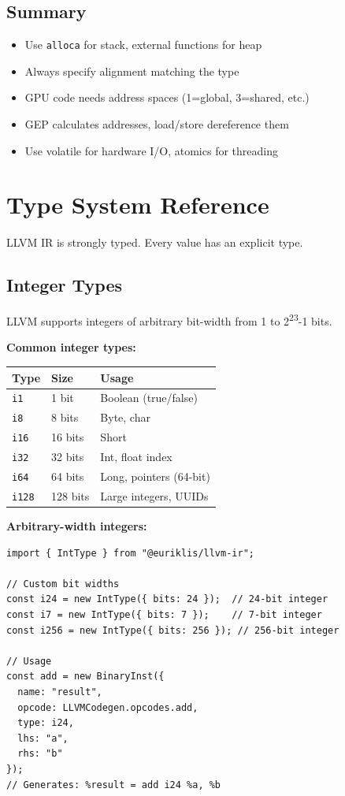 \documentclass[11pt]{article}
\begin{document}
\subsection{Summary}

\begin{itemize}[noitemsep]
  \item Use \texttt{alloca} for stack, external functions for heap
  \item Always specify alignment matching the type
  \item GPU code needs address spaces (1=global, 3=shared, etc.)
  \item GEP calculates addresses, load/store dereference them
  \item Use volatile for hardware I/O, atomics for threading
\end{itemize}

\section{Type System Reference}

LLVM IR is strongly typed. Every value has an explicit type.

\subsection{Integer Types}

LLVM supports integers of arbitrary bit-width from 1 to 2\textsuperscript{23}-1 bits.

\textbf{Common integer types:}
\begin{center}
\begin{tabular}{|l|l|l|}
\hline
\textbf{Type} & \textbf{Size} & \textbf{Usage} \\
\hline
\texttt{i1} & 1 bit & Boolean (true/false) \\
\texttt{i8} & 8 bits & Byte, char \\
\texttt{i16} & 16 bits & Short \\
\texttt{i32} & 32 bits & Int, float index \\
\texttt{i64} & 64 bits & Long, pointers (64-bit) \\
\texttt{i128} & 128 bits & Large integers, UUIDs \\
\hline
\end{tabular}
\end{center}

\textbf{Arbitrary-width integers:}
\begin{lstlisting}[style=ts]
import { IntType } from "@euriklis/llvm-ir";

// Custom bit widths
const i24 = new IntType({ bits: 24 });  // 24-bit integer
const i7 = new IntType({ bits: 7 });    // 7-bit integer
const i256 = new IntType({ bits: 256 }); // 256-bit integer

// Usage
const add = new BinaryInst({
  name: "result",
  opcode: LLVMCodegen.opcodes.add,
  type: i24,
  lhs: "a",
  rhs: "b"
});
// Generates: %result = add i24 %a, %b
\end{lstlisting}
\end{document}
